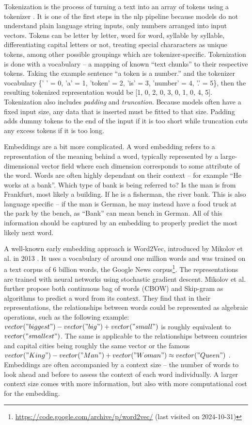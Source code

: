 Tokenization is the process of turning a text into an array of tokens using a tokenizer \cite{Jurafsky.2024,Nadkarni.2011}.
It is one of the first steps in the \ac{nlp} pipeline because models do not understand plain language string inputs, only numbers arranged into input vectors.
Tokens can be letter by letter, word for word, syllable by syllable, differentiating capital letters or not, treating special chararacters as unique tokens, among other possible groupings which are tokenizer-specific.
Tokenization is done with a vocabulary -- a mapping of known \enquote{text chunks} to their respective tokens.
Taking the example sentence \enquote{a token is a number.} and the tokenizer vocabulary \{' ' = 0, 'a' = 1, 'token' = 2, 'is' = 3, 'number' = 4, '.' = 5\}, then the resulting tokenized representation would be [1, 0, 2, 0, 3, 0, 1, 0, 4, 5].
Tokenization also includes \emph{padding} and \emph{truncation}.
Because models often have a fixed input size, any data that is inserted must be fitted to that size.
Padding adds dummy tokens to the end of the input if it is too short while truncation cuts any excess tokens if it is too long.

Embeddings are a bit more complicated.
A word embedding refers to a representation of the meaning behind a word, typically represented by a large-dimensional vector field where each dimension corresponds to some attribute of the word.
Words are often highly dependant on their context -- for example \enquote{He works at a bank}.
Which type of bank is being referred to?
Is the man is from Frankfurt, most likely a building.
If he is a fisherman, the river bank.
This is also language specific -- if the man is German, he may instead have a food truck at the park by the bench, as \enquote{Bank} can mean bench in German.
All of this information should be captured by an embedding to properly predict the most likely next word.

A well-known early embedding approach is Word2Vec, introduced by Mikolov et al. in 2013 \cite{Mikolov.2013b}.
It uses a vocabulary of around one million words and was trained on a text corpus of 6 billion words, the Google News corpus\footnote{\url{https://code.google.com/archive/p/word2vec/} (last visited on 2024-10-31)}.
The representations are trained with neural networks using stochastic gradient descent. Mikolov et al. further propose both continuous bag of words (CBOW) and Skip-gram as algorithms to predict a word from its context.
They find that in their representations, the relationships between words could be represented as algebraic operations, such as the following example: $vector("biggest") - vector("big") + vector("small")$ is roughly equivalent to $vector("smallest")$.
The same is applicable to the relationships between countries and capital cities being roughly the same vector or the famous $vector("King") - vector("Man") + vector("Woman") \approx vector("Queen")$ \cite{Mikolov.2013}.
Embeddings are often accompanied by a context size -- the number of words to look ahead and before to assess the context of each word individually.
A larger context size comes with more information, but also with more computational cost for the embedding.

